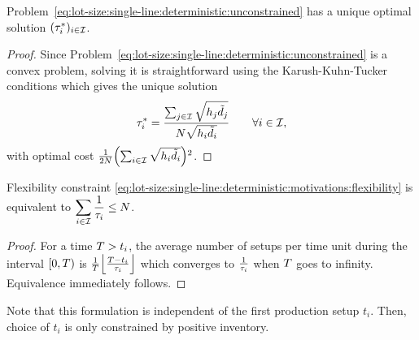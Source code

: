

\begin{lem}\label{lem:lot-size:single-line:deterministic:unconstrained:optimality}
Problem~\eqref{eq:lot-size:single-line:deterministic:unconstrained} has a unique optimal solution $(\tau_i^*)_{i\in\mathcal{I}}$.
\end{lem}


\begin{proof}
Since Problem~\eqref{eq:lot-size:single-line:deterministic:unconstrained} is a convex problem, solving it is straightforward using the Karush-Kuhn-Tucker conditions which gives the unique solution
\begin{equation}
  \tau_i^*= \frac{\sum_{j\in\mathcal{I}}\sqrt{h_j\tilde{d}_j}}{N\sqrt{h_i\tilde{d}_i}}\qquad\forall i\in\mathcal{I},
\end{equation}
with optimal cost $\frac{1}{2\nbsetups}\bracket{\sum_{i\in\REF}\sqrt{\holding_i\tilde{\demand_i}}}^2$.
\end{proof}



\begin{lem}\label{lem:lot-size:single-line:models:average-setup}
Flexibility constraint \eqref{eq:lot-size:single-line:deterministic:motivations:flexibility} is equivalent to
$\displaystyle\sum_{i\in\mathcal{I}} \frac{1}{\tau_i} \le N$.
\end{lem}


\begin{proof}
For a time $T>t_i$, the average number of setups per time unit during the interval $[0,T)$ is
$\frac{1}{\horizon}\left\lfloor\frac{\horizon-t_i}{\cover_i}\right\rfloor$
which converges to $\frac{1}{\tau_i}$ when $T$ goes to infinity.
Equivalence immediately follows.
\end{proof}


Note that this formulation is independent of the first production setup $t_i$.
Then, choice of $t_i$ is only constrained by positive inventory.


